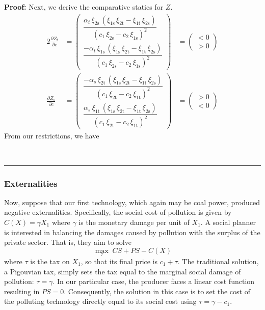 \documentclass[12pt,a4paper]{extarticle}
\newenvironment{proof}[1][Proof]{\noindent\textbf{#1:} }{\ \rule{0.5em}{0.5em}}
\begin{document}
\begin{proof}
Next, we derive the comparative statics for $Z$. 
\begin{alignat*}{2}
\frac{\partial Z_t}{\partial c} &= 
\begin{pmatrix}
\dfrac{\alpha _{t}\,\xi _{\mathrm{2s}}\,\left(\xi _{\mathrm{1s}}\,\xi _{\mathrm{2t}}-\xi _{\mathrm{1t}}\,\xi _{\mathrm{2s}}\right)}{{\left(c_{1}\,\xi _{\mathrm{2s}}-c_{2}\,\xi _{\mathrm{1s}}\right)}^2}\\
\dfrac{-\alpha _{t}\,\xi _{\mathrm{1s}}\,\left(\xi _{\mathrm{1s}}\,\xi _{\mathrm{2t}}-\xi _{\mathrm{1t}}\,\xi _{\mathrm{2s}}\right)}{{\left(c_{1}\,\xi _{\mathrm{2s}}-c_{2}\,\xi _{\mathrm{1s}}\right)}^2}
\end{pmatrix}
&=
\begin{pmatrix}
< 0 \\
> 0 
\end{pmatrix} \\
\frac{\partial Z_s}{\partial c} &= 
\begin{pmatrix}
\dfrac{-\alpha _{s}\,\xi _{\mathrm{2t}}\,\left(\xi _{\mathrm{1s}}\,\xi _{\mathrm{2t}}-\xi _{\mathrm{1t}}\,\xi _{\mathrm{2s}}\right)}{{\left(c_{1}\,\xi _{\mathrm{2t}}-c_{2}\,\xi _{\mathrm{1t}}\right)}^2} \\
\dfrac{\alpha _{s}\,\xi _{\mathrm{1t}}\,\left(\xi _{\mathrm{1s}}\,\xi _{\mathrm{2t}}-\xi _{\mathrm{1t}}\,\xi _{\mathrm{2s}}\right)}{{\left(c_{1}\,\xi _{\mathrm{2t}}-c_{2}\,\xi _{\mathrm{1t}}\right)}^2}
\end{pmatrix}
&=
\begin{pmatrix}
> 0 \\
< 0 
\end{pmatrix}
\end{alignat*}
From our restrictions, we have 

\hfill
\end{proof}

\clearpage

\subsubsection{Externalities}

Now, suppose that our first technology, which again may be coal power, produced negative externalities. Specifically, the social cost of pollution is given by $C(X) = \gamma X_1$ where $\gamma$ is the monetary damage per unit of $X_1$. A social planner is interested in balancing the damages caused by pollution with the surplus of the private sector. That is, they aim to solve
$$\max_{\tau} \; CS + PS - C(X)$$
where $\tau$ is the tax on $X_1$, so that its final price is $c_1 + \tau$. The traditional solution, a Pigouvian tax, simply sets the tax equal to the marginal social damage of pollution: $\tau = \gamma$. In our particular case, the producer faces a linear cost function resulting in $PS = 0$. Consequently, the solution in this case is to set the cost of the polluting technology directly equal to its social cost using $\tau = \gamma - c_1$. 
\end{document}
